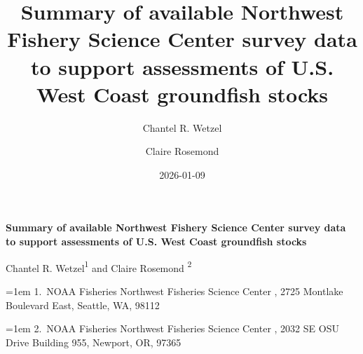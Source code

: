 \documentclass[
  english,
]{article}
\title{Summary of available Northwest Fishery Science Center survey data
to support assessments of U.S. West Coast groundfish stocks}
\author{Chantel R. Wetzel \and Claire Rosemond}
\date{2026-01-09}
\begin{document}
  \begin{titlepage}

  \begin{minipage}[b][\textheight][s]{\textwidth}


  \raggedright




  {\huge\bfseries\nohyphens{Summary of available Northwest Fishery
  Science Center survey data to support assessments of U.S. West Coast
  groundfish stocks}}\\[1\baselineskip]



  \vspace{1\baselineskip}


  \vspace{1\baselineskip}

   {\large{Chantel R. Wetzel}}{\textsuperscript{1}}%
  { and \large{Claire Rosemond}}%
  {\textsuperscript{2}}%



  \vspace{2\baselineskip}

  \hangindent=1em
  {1}.~{NOAA Fisheries Northwest Fisheries Science Center}%
  , %
  {2725 Montlake Boulevard East, Seattle, WA, 98112}%
  \par\hangindent=1em%
  {2}.~{NOAA Fisheries Northwest Fisheries Science Center}%
  , %
  {2032 SE OSU Drive Building 955, Newport, OR, 97365}%



\end{minipage}
\end{titlepage}
\end{document}
